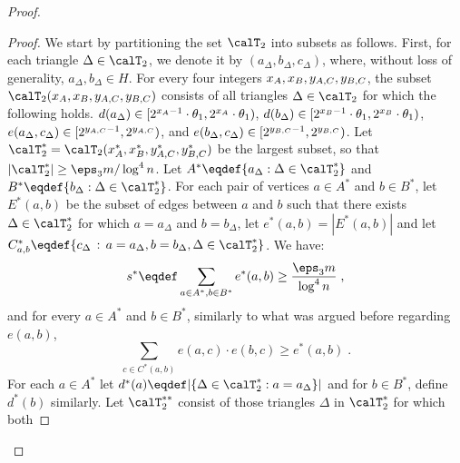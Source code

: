 \begin{proof}
\begin{proof}
We start by partitioning the set $\calT_2$ into subsets as follows. First, for each triangle $\Delta \in \calT_2$, we 
denote it by $(a_\Delta, b_\Delta, c_\Delta)$, where, without loss of generality, $a_\Delta, b_\Delta\in H$. For every four integers $x_{\tiny A},x_{\tiny B},y_{\tiny A,C},y_{\tiny B,C}$,  the subset $\calT_2(x_{\tiny A},x_{\tiny B},y_{\tiny A,C},y_{\tiny B,C})$ consists of all triangles $\Delta \in \calT_2$ for which the following holds.
$d(a_\Delta) \in [2^{x_{\tiny A}-1}\cdot \theta_1 , 2^{x_{\tiny A}}\cdot \theta_1)$, $d(b_\Delta) \in [2^{x_{\tiny B}-1}\cdot \theta_1,  2^{x_{\tiny B}}\cdot \theta_1)$, $e(a_\Delta,c_\Delta) \in [2^{y_{\tiny A,C}-1}, 2^{y_{\tiny A,C}})$, and $e(b_\Delta,c_\Delta) \in [ 2^{y_{\tiny B,C}-1},  2^{y_{\tiny B,C}})$.
Let $\calT^*_2 = \calT_2(x^*_{\tiny A},x^*_{\tiny B},y^*_{\tiny A,C},y^*_{\tiny B,C})$ be the largest subset, so that $|\calT^*_2| \geq \eps_3 m/\log^4 n$. 
Let $A^* \eqdef \{a_\Delta: \Delta \in \calT^*_2\}$ and $B^* \eqdef \{b_\Delta:\Delta \in \calT^*_2\}$. 
For each pair of vertices $a\in A^*$ and $b\in B^*$, let $E^*(a,b)$ be the subset of
edges between $a$ and $b$ such that there exists $\Delta\in \calT^*_2$ for which
$a = a_\Delta$ and $b = b_\Delta$, let $e^*(a,b) = |E^*(a,b)|$
and let $C^*_{a,b} \eqdef \{c_\Delta\,:\, a = a_\Delta, b=b_\Delta, \Delta \in \calT^*_2\}$. 
We have:
\begin{equation}\label{eq:sum-e-star}
s^* \eqdef \sum_{a\in A^*, b\in B^*} e^*(a,b) \geq \frac{\eps_3 m}{\log^4 n}\;,
\end{equation}
and for every $a \in A^*$ and $b\in B^*$, similarly to what was argued before regarding $e(a,b)$,
\begin{equation}\label{eq:e-star-ub}
\sum_{c\in C^*(a,b)} e(a,c)\cdot e(b,c) \geq e^*(a,b)\;.
\end{equation}
\iffalse
For each $a \in A^*$ let $d^*(a) \eqdef |\{\Delta \in \calT^*_2 : a = a_\Delta\}|$ and
for $b \in B^*$, define $d^*(b)$ similarly.  
Let $\calT^{**}_2$ consist of those triangles $\Delta$ in $\calT^*_2$ for which both 

\end{proof}
\end{proof}
